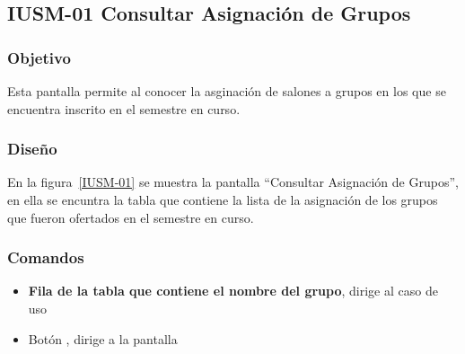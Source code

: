 \subsection{IUSM-01  Consultar Asignación de Grupos}

\subsubsection{Objetivo}

	
    Esta pantalla permite al  conocer la asginación de salones a grupos en los que se encuentra inscrito en el semestre en curso.
\subsubsection{Diseño}


    En la figura~\ref{IUSM-01} se muestra la pantalla ``Consultar Asignación de Grupos'', en ella se encuntra la tabla que contiene la lista de la asignación de los grupos que fueron ofertados en el semestre en curso.



\subsubsection{Comandos}
    \begin{itemize}

	\item \textbf{Fila de la tabla que contiene el nombre del grupo}, dirige al caso de uso 
		\item Botón , dirige a la pantalla  
    \end{itemize}
